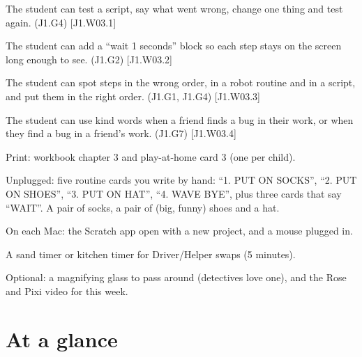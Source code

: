 
\begin{objectives}
  \item The student can test a script, say what went wrong, change one thing and test again. (J1.G4) [J1.W03.1]
  \item The student can add a \enquote{wait 1 seconds} block so each step stays on the screen long enough to see. (J1.G2) [J1.W03.2]
  \item The student can spot steps in the wrong order, in a robot routine and in a script, and put them in the right order. (J1.G1, J1.G4) [J1.W03.3]
  \item The student can use kind words when a friend finds a bug in their work, or when they find a bug in a friend's work. (J1.G7) [J1.W03.4]
\end{objectives}

\begin{materials}
  \item Print: workbook chapter 3 and play-at-home card 3 (one per child).
  \item Unplugged: five routine cards you write by hand: \enquote{1. PUT ON SOCKS}, \enquote{2. PUT ON SHOES}, \enquote{3. PUT ON HAT}, \enquote{4. WAVE BYE}, plus three cards that say \enquote{WAIT}. A pair of socks, a pair of (big, funny) shoes and a hat.
  \item On each Mac: the Scratch app open with a new project, and a mouse plugged in.
  \item A sand timer or kitchen timer for Driver/Helper swaps (5 minutes).
  \item Optional: a magnifying glass to pass around (detectives love one), and the Rose and Pixi video for this week.
\end{materials}

\section{At a glance}
\begin{timeplan}
\end{timeplan}

